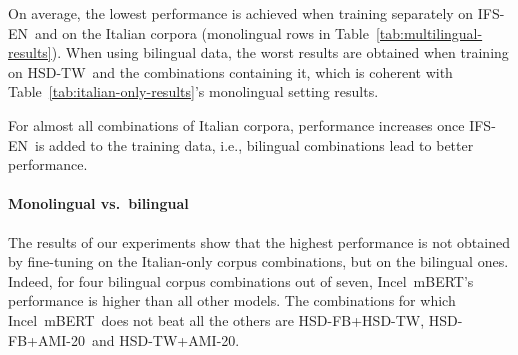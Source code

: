 \documentclass[11pt]{article}
\newcommand{\dsENclassification}{IFS-EN}
\newcommand{\dsITclassification}{IFS-IT}
\newcommand{\mbert}{\mbox{mBERT$_{base}$}}
\newcommand{\imbert}{\mbox{Incel mBERT}}
\newcommand{\hsdfb}{\mbox{HSD-FB}}
\newcommand{\hsdtw}{\mbox{HSD-TW}}
\newcommand{\ami}{\mbox{AMI-20}}
\begin{document}
On average, the lowest performance is achieved when training separately on \dsENclassification\, and on the Italian corpora (monolingual rows in Table~\ref{tab:multilingual-results}). When using bilingual data, the worst results are obtained when training on \hsdtw\, and the combinations containing it, which is coherent with \mbox{Table~\ref{tab:italian-only-results}'s} monolingual setting results.

For almost all combinations of Italian corpora, performance increases once \dsENclassification\, is added to the training data, i.e., bilingual combinations lead to better performance.


\paragraph{Monolingual vs.\ bilingual}
The results of our experiments show that the highest performance is not obtained by fine-tuning on the Italian-only corpus combinations, but on the bilingual ones. Indeed, for four bilingual corpus combinations out of seven, \imbert's performance is higher than all other models.
The combinations for which \imbert\, does not beat all the others are \hsdfb+\hsdtw, \hsdfb+\ami\, and \hsdtw+\ami.
\end{document}
